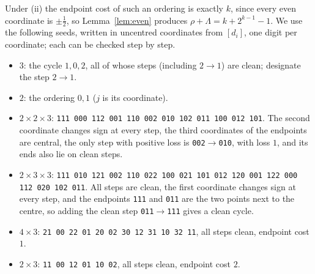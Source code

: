 \documentclass[11pt]{article}
\theoremstyle{remark}
\begin{document}
Under (ii) the endpoint cost of such an ordering is exactly $k$, since every
even coordinate is $\pm\frac12$, so Lemma~\ref{lem:even} produces $\rho+\Lambda=
k+2^{k-1}-1$. We use the following seeds, written in uncentred coordinates
from $[d_i]$, one digit per coordinate; each can be checked step by step.
\begin{itemize}
\item[(S1)] $3$: the cycle $1,0,2$, all of whose steps (including $2\to1$)
are clean; designate the step $2\to1$.
\item[(S2)] $2$: the ordering $0,1$ ($j$ is its coordinate).
\item[(S3)] $2\times2\times3$: \texttt{111 000 112 001 110 002 010 102 011 100
012 101}. The second coordinate changes sign at every step, the third
coordinates of the endpoints are central, the only step with positive loss is
\texttt{002}$\to$\texttt{010}, with loss $1$, and its ends also lie on clean
steps.
\item[(S4)] $2\times3\times3$: \texttt{111 010 121 002 110 022 100 021 101 012
120 001 122 000 112 020 102 011}. All steps are clean, the first coordinate
changes sign at every step, and the endpoints \texttt{111} and \texttt{011} are
the two points next to the centre, so adding the clean step
\texttt{011}$\to$\texttt{111} gives a clean cycle.
\item[(S5)] $4\times3$: \texttt{21 00 22 01 20 02 30 12 31 10 32 11}, all
steps clean, endpoint cost $1$.
\item[(S6)] $2\times3$: \texttt{11 00 12 01 10 02}, all steps clean, endpoint
cost $2$.
\end{itemize}
\end{document}
